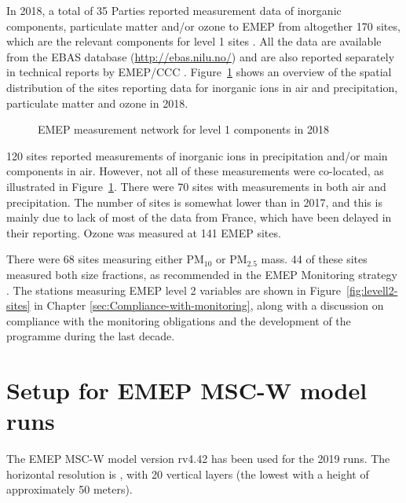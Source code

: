 In 2018, a total of 35 Parties reported measurement data of inorganic components, particulate matter and/or ozone to EMEP from altogether 170 sites, which are the relevant components for level 1 sites \citep{MonStrat2019}. 
All the data are available from the EBAS database (\url{http://ebas.nilu.no/}) and are also reported separately in technical reports by EMEP/CCC \citep{Hjellbrekke2020a,Hjellbrekke2020b}. Figure~\ref{fig:EMEP-measurement-network} shows an overview of the spatial distribution of the sites reporting data for inorganic ions in air and precipitation, particulate matter and ozone in 2018.

\begin{figure}[h!]
 \centering
\caption{\label{fig:EMEP-measurement-network}EMEP measurement network for level 1 components in 2018}
\end{figure}

120 sites reported measurements of inorganic ions in precipitation and/or main components in air. However, not all of these measurements were co-located, as illustrated in Figure~\ref{fig:EMEP-measurement-network}. There were 70 sites with measurements in both air and precipitation. The number of sites is somewhat lower than in 2017, and this is mainly due to lack of most of the data from France, which have been delayed in their reporting. Ozone was measured at 141 EMEP sites.

There were 68 sites measuring either PM$_{10}$ or PM$_{2.5}$ mass. 44 of these sites measured both size fractions, as recommended in the EMEP Monitoring strategy \citep{MonStrat2019}. The stations measuring EMEP level 2 variables are shown in Figure~\ref{fig:levell2-sites} in Chapter \ref{sec:Compliance-with-monitoring}, along with a discussion on compliance with the monitoring obligations and the development of the programme during the last decade.

\section{Setup for EMEP MSC-W model runs}
\label{Mod_2019}

The EMEP MSC-W model version rv4.42 has been used for the 2019
runs. The horizontal resolution is \resZO, with 20 vertical layers
(the lowest with a height of approximately 50 meters).

